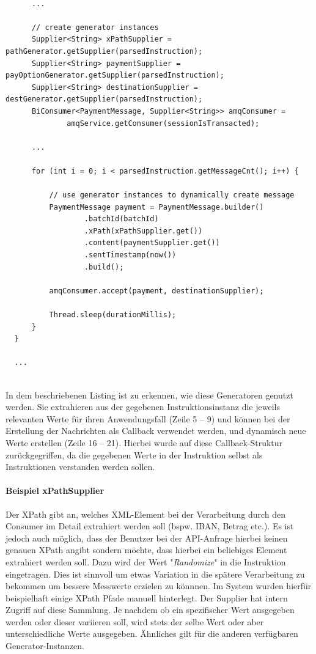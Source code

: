 \begin{minipage}{\linewidth}
\begin{lstlisting}[style=javaStyle,caption={Supplier - Service},label=lst:supplierServiceImpl]
  
      ...

      // create generator instances
      Supplier<String> xPathSupplier = pathGenerator.getSupplier(parsedInstruction);
      Supplier<String> paymentSupplier = payOptionGenerator.getSupplier(parsedInstruction);
      Supplier<String> destinationSupplier = destGenerator.getSupplier(parsedInstruction);
      BiConsumer<PaymentMessage, Supplier<String>> amqConsumer =
              amqService.getConsumer(sessionIsTransacted);

      ...

      for (int i = 0; i < parsedInstruction.getMessageCnt(); i++) {

          // use generator instances to dynamically create message
          PaymentMessage payment = PaymentMessage.builder()
                  .batchId(batchId)
                  .xPath(xPathSupplier.get())
                  .content(paymentSupplier.get())
                  .sentTimestamp(now())
                  .build();

          amqConsumer.accept(payment, destinationSupplier);

          Thread.sleep(durationMillis);
      }
  }

  ...
  
\end{lstlisting}
\end{minipage}

In dem beschriebenen Listing ist zu erkennen, wie diese Generatoren genutzt werden. Sie extrahieren aus der gegebenen Instruktionsinstanz die jeweils relevanten Werte für ihren Anwendungsfall (Zeile 5 -- 9) und können bei der Erstellung der Nachrichten als Callback verwendet werden, und dynamisch neue Werte erstellen (Zeile 16 -- 21). Hierbei wurde auf diese Callback-Struktur zurückgegriffen, da die gegebenen Werte in der Instruktion selbst als Instruktionen verstanden werden sollen.

\paragraph{Beispiel xPathSupplier} 
Der XPath gibt an, welches XML-Element bei der Verarbeitung durch den Consumer im Detail extrahiert werden soll (bspw. IBAN, Betrag etc.). Es ist jedoch auch möglich, dass der Benutzer bei der API-Anfrage hierbei keinen genauen XPath angibt sondern möchte, dass hierbei ein beliebiges Element extrahiert werden soll. Dazu wird der Wert "\emph{Randomize}" in die Instruktion eingetragen. Dies ist sinnvoll um etwas Variation in die spätere Verarbeitung zu bekommen um bessere Messwerte erzielen zu könnnen. Im System wurden hierfür beispielhaft einige XPath Pfade manuell hinterlegt. Der Supplier hat intern Zugriff auf diese Sammlung. Je nachdem ob ein spezifischer Wert ausgegeben werden oder dieser variieren soll, wird stets der selbe Wert oder aber unterschiedliche Werte ausgegeben. Ähnliches gilt für die anderen verfügbaren Generator-Instanzen.

